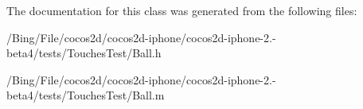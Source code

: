 The documentation for this class was generated from the following files\-:\begin{DoxyCompactItemize}
\item 
/\-Bing/\-File/cocos2d/cocos2d-\/iphone/cocos2d-\/iphone-\/2.-\/beta4/tests/\-Touches\-Test/Ball.\-h\item 
/\-Bing/\-File/cocos2d/cocos2d-\/iphone/cocos2d-\/iphone-\/2.-\/beta4/tests/\-Touches\-Test/Ball.\-m\end{DoxyCompactItemize}
